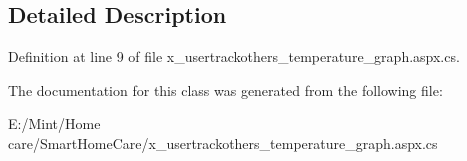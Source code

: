 \subsection{Detailed Description}


Definition at line 9 of file x\-\_\-usertrackothers\-\_\-temperature\-\_\-graph.\-aspx.\-cs.



The documentation for this class was generated from the following file\-:\begin{DoxyCompactItemize}
\item 
E\-:/\-Mint/\-Home care/\-Smart\-Home\-Care/x\-\_\-usertrackothers\-\_\-temperature\-\_\-graph.\-aspx.\-cs\end{DoxyCompactItemize}
